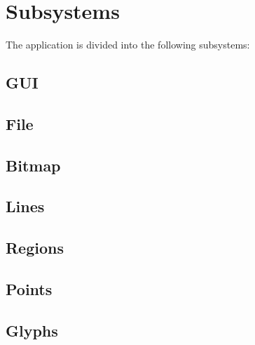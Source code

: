 \section{Subsystems}
The application is divided into the following subsystems:

\subsection{GUI}
\subsection{File}
\subsection{Bitmap}
\subsection{Lines}
\subsection{Regions}
\subsection{Points}
\subsection{Glyphs}
